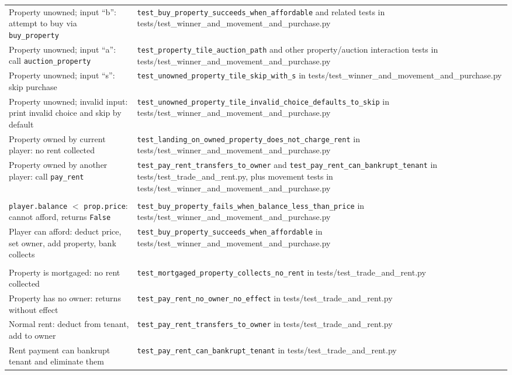 \documentclass[11pt]{article}
\begin{document}
\begin{longtable}{>{\raggedright\arraybackslash}p{} >{\raggedright\arraybackslash}p{}}
\multicolumn{2}{l}{\textbf{moneypoly.game: handle\_property\_tile}} \\ \hline
Property unowned; input ``b'': attempt to buy via \texttt{buy\_property} & \texttt{test\_buy\_property\_succeeds\_when\_affordable} and related tests in tests/test\_winner\_and\_movement\_and\_purchase.py \\ \hline
Property unowned; input ``a'': call \texttt{auction\_property} & \texttt{test\_property\_tile\_auction\_path} and other property/auction interaction tests in tests/test\_winner\_and\_movement\_and\_purchase.py \\ \hline
Property unowned; input ``s'': skip purchase & \texttt{test\_unowned\_property\_tile\_skip\_with\_s} in tests/test\_winner\_and\_movement\_and\_purchase.py \\ \hline
Property unowned; invalid input: print invalid choice and skip by default & \texttt{test\_unowned\_property\_tile\_invalid\_choice\_defaults\_to\_skip} in tests/test\_winner\_and\_movement\_and\_purchase.py \\ \hline
Property owned by current player: no rent collected & \texttt{test\_landing\_on\_owned\_property\_does\_not\_charge\_rent} in tests/test\_winner\_and\_movement\_and\_purchase.py \\ \hline
Property owned by another player: call \texttt{pay\_rent} & \texttt{test\_pay\_rent\_transfers\_to\_owner} and \texttt{test\_pay\_rent\_can\_bankrupt\_tenant} in tests/test\_trade\_and\_rent.py, plus movement tests in tests/test\_winner\_and\_movement\_and\_purchase.py \\ \hline

\multicolumn{2}{l}{\textbf{moneypoly.game: buy\_property}} \\ \hline
\texttt{player.balance} $<$ \texttt{prop.price}: cannot afford, returns \texttt{False} & \texttt{test\_buy\_property\_fails\_when\_balance\_less\_than\_price} in tests/test\_winner\_and\_movement\_and\_purchase.py \\ \hline
Player can afford: deduct price, set owner, add property, bank collects & \texttt{test\_buy\_property\_succeeds\_when\_affordable} in tests/test\_winner\_and\_movement\_and\_purchase.py \\ \hline

\multicolumn{2}{l}{\textbf{moneypoly.game: pay\_rent}} \\ \hline
Property is mortgaged: no rent collected & \texttt{test\_mortgaged\_property\_collects\_no\_rent} in tests/test\_trade\_and\_rent.py \\ \hline
Property has no owner: returns without effect & \texttt{test\_pay\_rent\_no\_owner\_no\_effect} in tests/test\_trade\_and\_rent.py \\ \hline
Normal rent: deduct from tenant, add to owner & \texttt{test\_pay\_rent\_transfers\_to\_owner} in tests/test\_trade\_and\_rent.py \\ \hline
Rent payment can bankrupt tenant and eliminate them & \texttt{test\_pay\_rent\_can\_bankrupt\_tenant} in tests/test\_trade\_and\_rent.py \\ \hline


\end{longtable}
\end{document}
